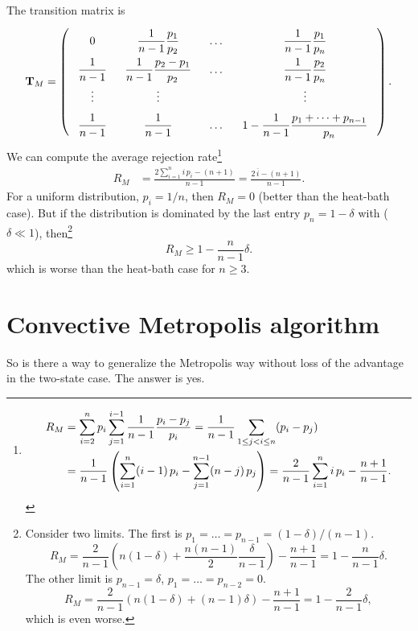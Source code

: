\documentclass[12pt]{article}
\begin{document}
The transition matrix is
$$
\mathbf T_M =
\left(
  \arraycolsep=8.0pt\def\arraystretch{2.0}
  \begin{array}{cccccc}
    0   & \dfrac{1}{n-1}\dfrac{p_1}{p_2} & \dots & \dfrac{1}{n-1}\dfrac{p_1}{p_n} \\
    \dfrac{1}{n-1} & \dfrac{1}{n-1}\dfrac{p_2-p_1}{p_2} & \dots & \dfrac{1}{n-1}\dfrac{p_2}{p_n} \\
    \vdots & \vdots  &  & \vdots \\
    \dfrac{1}{n-1} & \dfrac{1}{n-1} & \dots & 1 - \dfrac{1}{n-1}\dfrac{p_1 + \cdots + p_{n-1}}{p_n}
  \end{array}
\right).
$$
We can compute the average rejection rate\footnote{
\begin{align*}
  R_M
  &= \sum_{i = 2}^n p_i \sum_{j = 1}^{i-1} \frac{1}{n-1} \frac{p_i - p_j} { p_i }
  = \frac{1}{n-1} \sum_{1 \le j < i \le n} (p_i - p_j)
  \notag \\
  &= \frac{1}{n-1} \left( \sum_{i=1}^n (i - 1) \, p_i - \sum_{j = 1}^{n-1} (n - j) \, p_j \right)
  = \frac{2}{n-1} \sum_{i=1}^n i \, p_i - \frac{n+1}{n-1}.
\end{align*}
}
\begin{align}
  R_M
  &= \frac{2 \sum_{i=1}^n i \, p_i - (n + 1) }{n-1}
  = \frac{ 2 \, \overline i - (n + 1) } { n - 1 }.
\label{eq:rejection_Metropolis}
\end{align}
For a uniform distribution, $p_i = 1/n$, then $R_M = 0$
(better than the heat-bath case).
But if the distribution is dominated by
the last entry $p_n = 1 - \delta$
with ($\delta \ll 1$),
then\footnote{
Consider two limits.
The first is $p_1 = \dots = p_{n-1} = (1-\delta)/(n-1)$.
$$
R_M = \frac{2}{n-1}
\left( n (1 - \delta) + \frac{n(n-1)}{2} \frac{\delta}{n-1} \right)
- \frac{ n + 1 } { n - 1 } = 1 - \frac{n}{n-1}\delta.
$$
The other limit is $p_{n-1} = \delta$, $p_1 = \dots = p_{n-2} = 0$.
$$
R_M = \frac{2}{n-1}
\left( n (1 - \delta) + (n-1)\delta \right)
- \frac{ n + 1 } { n - 1 } = 1 - \frac{2}{n-1}\delta,
$$
which is even worse.
}
$$
R_M \ge 1 - \frac{n}{n-1}\delta.
$$
which is worse than the heat-bath case for $n \ge 3$.
%



\section{\label{sec:convective}
Convective Metropolis algorithm}



So is there a way to generalize
the Metropolis way without loss of the advantage in the two-state case.
%
The answer is yes.
\end{document}
